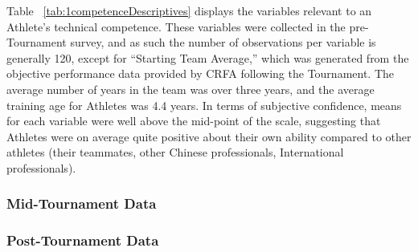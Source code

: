 

Table ~\ref{tab:1competenceDescriptives} displays the variables relevant to an Athlete's technical competence.  These variables were collected in the pre-Tournament survey, and as such the number of observations per variable is generally 120, except for ``Starting Team Average,'' which was generated from the objective performance data provided by CRFA following the Tournament.  The average number of years in the team was over three years, and the average training age for Athletes was 4.4 years.  In terms of subjective confidence, means for each variable were well above the mid-point of the scale, suggesting that Athletes were on average quite positive about their own ability compared to other athletes (their teammates, other Chinese professionals, International professionals).

\subsubsection{Mid-Tournament Data}



\subsubsection{Post-Tournament Data}




%












